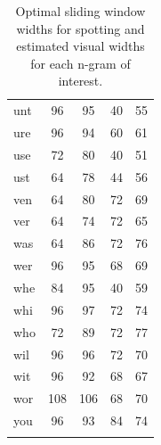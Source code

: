\documentclass[ms,electronic,twosidetoc,letterpaper,chaptercenter,parttop,lof,lot]{byumsphd}
\begin{document}
\begin{longtable}{| l | c c | c c |}
  unt & 96 & 95 & 40 & 55 \\
  ure & 96 & 94 & 60 & 61 \\
  use & 72 & 80 & 40 & 51 \\
  ust & 64 & 78 & 44 & 56 \\
  ven & 64 & 80 & 72 & 69 \\
  ver & 64 & 74 & 72 & 65 \\
  was & 64 & 86 & 72 & 76 \\
  wer & 96 & 95 & 68 & 69 \\
  whe & 84 & 95 & 40 & 59 \\
  whi & 96 & 97 & 72 & 74 \\
  who & 72 & 89 & 72 & 77 \\
  wil & 96 & 96 & 72 & 70 \\
  wit & 96 & 92 & 68 & 67 \\
  wor & 108 & 106 & 68 & 70 \\
  you & 96 & 93 & 84 & 74 \\
  \hline 
\caption{Optimal sliding window widths for spotting and estimated visual widths for each n-gram of interest.}
\label{tab:customwidths}
\end{longtable}





\end{document}
